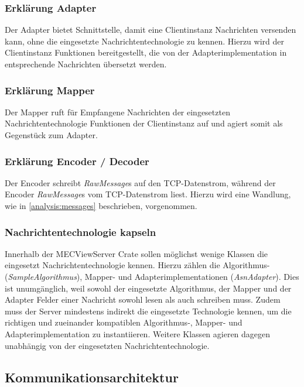 \subsubsection{Erklärung Adapter}

Der Adapter bietet  Schnittstelle, damit eine Clientinstanz Nachrichten versenden kann, ohne die eingesetzte Nachrichtentechnologie zu kennen.
Hierzu wird der Clientinstanz Funktionen bereitgestellt, die von der Adapterimplementation in entsprechende Nachrichten übersetzt werden.

\subsubsection{Erklärung Mapper}

Der Mapper ruft für Empfangene Nachrichten der eingesetzten Nachrichtentechnologie Funktionen der Clientinstanz auf und agiert somit als Gegenstück zum Adapter.

\subsubsection{Erklärung Encoder / Decoder}

Der Encoder schreibt \textit{RawMessage}s auf den TCP-Datenstrom, während der Encoder \textit{RawMessage}s vom TCP-Datenstrom liest.
Hierzu wird eine Wandlung, wie in \autoref{analysis:messages} beschrieben, vorgenommen.

\subsubsection{Nachrichtentechnologie kapseln}

Innerhalb der MECViewServer Crate sollen möglichst wenige Klassen die eingesetzt Nachrichtentechnologie kennen.
Hierzu zählen die Algorithmus- (\textit{SampleAlgorithmus}), Mapper- und Adapterimplementationen (\textit{AsnAdapter}).
Dies ist unumgänglich, weil sowohl der eingesetzte Algorithmus, der Mapper und der Adapter Felder einer Nachricht sowohl lesen als auch schreiben muss.
Zudem muss der Server mindestens indirekt die eingesetzte Technologie kennen, um die richtigen und zueinander kompatiblen Algorithmus-, Mapper- und Adapterimplementation zu instantiieren.
Weitere Klassen agieren dagegen unabhängig von der eingesetzten Nachrichtentechnologie.

\subsection{Kommunikationsarchitektur}

